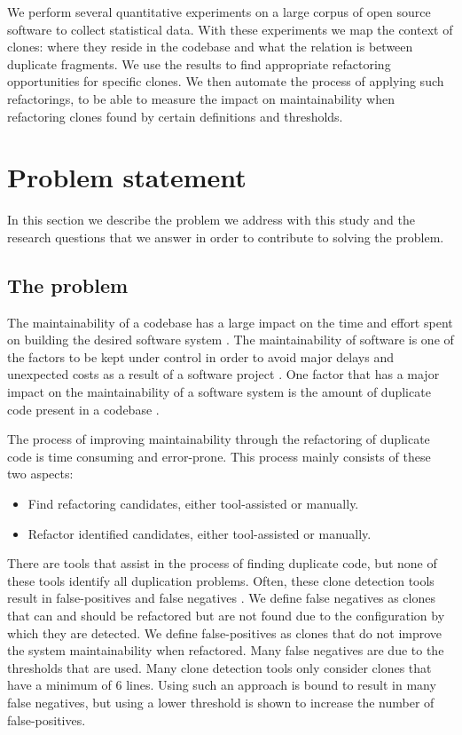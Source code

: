 We perform several quantitative experiments on a large corpus of open source software to collect statistical data. With these experiments we map the context of clones: where they reside in the codebase and what the relation is between duplicate fragments. We use the results to find appropriate refactoring opportunities for specific clones. We then automate the process of applying such refactorings, to be able to measure the impact on maintainability when refactoring clones found by certain definitions and thresholds.

\section{Problem statement}
In this section we describe the problem we address with this study and the research questions that we answer in order to contribute to solving the problem.

\subsection{The problem}
The maintainability of a codebase has a large impact on the time and effort spent on building the desired software system \cite{bakota2012cost, munson1978software}. The maintainability of software is one of the factors to be kept under control in order to avoid major delays and unexpected costs as a result of a software project \cite{fowler2018refactoring}. One factor that has a major impact on the maintainability of a software system is the amount of duplicate code present in a codebase \cite{heitlager2007practical, fowler1999refactoring}.

The process of improving maintainability through the refactoring of duplicate code is time consuming and error-prone. This process mainly consists of these two aspects:
\begin{itemize}
	\item Find refactoring candidates, either tool-assisted or manually.
	\item Refactor identified candidates, either tool-assisted or manually.
\end{itemize}
There are tools that assist in the process of finding duplicate code, but none of these tools identify all duplication problems. Often, these clone detection tools result in false-positives and false negatives \cite{roy2007survey}. We define false negatives as clones that can and should be refactored but are not found due to the configuration by which they are detected. We define false-positives as clones that do not improve the system maintainability when refactored. Many false negatives are due to the thresholds that are used. Many clone detection tools \cite{sajnani2016sourcerercc, svajlenko2016bigcloneeval} only consider clones that have a minimum of 6 lines. Using such an approach is bound to result in many false negatives, but using a lower threshold is shown to increase the number of false-positives. %

